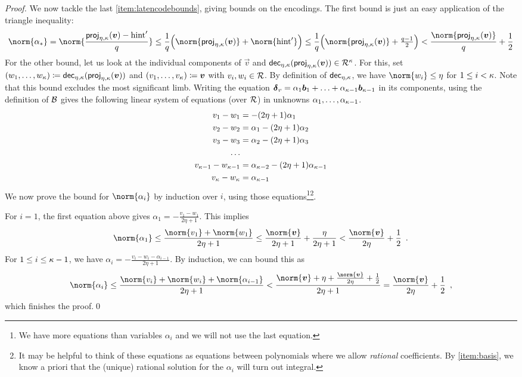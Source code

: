 \begin{proof}
\bigskip\noindent
We now tackle the last \autoref{item:latencodebounds}, giving bounds on the encodings.
The first bound is just an easy application of the triangle inequality:
\[
 \norm{\alpha_\qbasis} = \norm{ \frac{\projring(\vec{v}) - \hint'}{q}} \leq \frac{1}{q} \Bigl( \norm{\projring(\vec{v})} + \norm{\hint'}\Bigr)
 \leq \frac{1}{q}\Bigl(\norm{\projring(\vec{v})} + \tfrac{q-1}{2}\Bigr)
 < \frac{\norm{\projring(\vec{v})}}{q} + \frac{1}{2}
\]
For the other bound, let us look at the individual components of $\vec{v}$ and $\mathsf{dec}_{\eta,\kappa}(\mathsf{proj}_{\eta,\kappa}(\boldsymbol{v})) \in\mathcal{R}^\kappa$.
For this, set $(w_1,\ldots, w_{\kappa})  \coloneqq \mathsf{dec}_{\eta,\kappa}(\mathsf{proj}_{\eta,\kappa}(\boldsymbol{v}))$ and 
$(v_1,\ldots,v_{\kappa}) \coloneqq \boldsymbol{v}$ with $v_i,w_i\in\mathcal{R}$.
By definition of $\mathsf{dec}_{\eta,\kappa}$, we have $\norm{w_i}\leq \eta$ for $1\leq i < \kappa$.
Note that this bound excludes the most significant limb.
Writing the equation $\boldsymbol{\delta}_v = \alpha_1\boldsymbol{b}_1 + \ldots + \alpha_{\kappa-1}\boldsymbol{b}_{\kappa-1}$ in its components, using the definition of $\mathcal{B}$ gives the following linear system of equations (over $\mathcal{R}$) in unknowns $\alpha_1,\ldots,\alpha_{\kappa-1}$.
\begin{align*}
v_1 - w_1 &= -(2\eta+1)\alpha_1\\
v_2 - w_2 &= \alpha_1 - (2\eta+1)\alpha_2\\
v_3 - w_3 &= \alpha_2 - (2\eta+1)\alpha_3\\
\ldots\\
v_{\kappa-1} - w_{\kappa-1} &= \alpha_{\kappa-2} - (2\eta+1)\alpha_{\kappa-1}\\
v_{\kappa} - w_{\kappa} &= \alpha_{\kappa-1}
\end{align*}
We now prove the bound for $\norm{\alpha_i}$ by induction over $i$, using those equations\footnote{We have more equations than variables $\alpha_i$ and we will not use the last equation.}\footnote{It may be helpful to think of these equations as equations between polynomials where we allow \emph{rational} coefficients. By \autoref{item:basis}, we know a priori that the (unique) rational solution for the $\alpha_i$ will turn out integral.}.

\smallskip\noindent
For $i=1$, the first equation above gives $\alpha_1 = -\frac{v_1-w_1}{2\eta+1}$. This implies
\[
  \norm{\alpha_1} \leq \frac{\norm{v_1} + \norm{w_1}}{2\eta+1} \leq \frac{\norm{\vec{v}}}{2\eta+1} + \frac{\eta}{2\eta+1} < \frac{\norm{\vec{v}}}{2\eta} + \frac12\enspace.
\]
For $1\leq i\leq \kappa-1$, we have $\alpha_i = -\frac{v_{i}-w_{i} - \alpha_{i-1}}{2\eta+1}$. By induction, we can bound this as
\[
 \norm{\alpha_i} 
 \leq \frac{ \norm{v_{i}} + \norm{w_{i}} + \norm{\alpha_{i-1}} } {2\eta+1}  
 < \frac{ \norm{\vec{v}} + \eta + \frac{\norm{\vec{v}}}{2\eta} + \frac{1}{2} }{2\eta+1} = \frac{\norm{\vec{v}}}{2\eta} + \frac{1}{2}\enspace,
\]
which finishes the proof.\qed
\end{proof}

